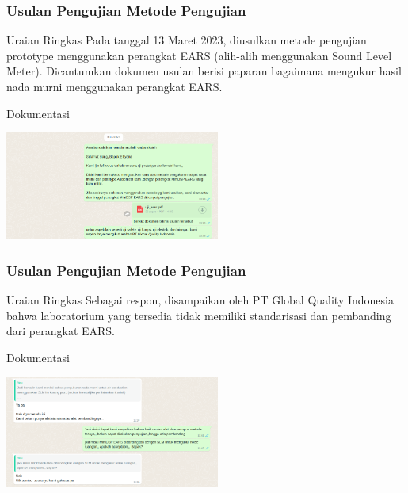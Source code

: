 \documentclass[table,dvipsnames]{beamer}
\begin{document}
	\begin{frame}
		\frametitle{Usulan Pengujian Metode Pengujian}

		\begin{exampleblock}{Uraian Ringkas}
			Pada tanggal 13 Maret 2023, diusulkan metode pengujian prototype menggunakan perangkat EARS (alih-alih menggunakan Sound Level Meter).
			Dicantumkan dokumen usulan berisi paparan bagaimana mengukur hasil nada murni menggunakan perangkat EARS.
		\end{exampleblock}

		\begin{exampleblock}{Dokumentasi}
			\begin{center}
				\includegraphics[width=200pt]{images/doc1}
			\end{center}
		\end{exampleblock}
	\end{frame}

	\begin{frame}
		\frametitle{Usulan Pengujian Metode Pengujian}

		\begin{exampleblock}{Uraian Ringkas}
			Sebagai respon, disampaikan oleh PT Global Quality Indonesia bahwa laboratorium yang tersedia tidak memiliki standarisasi dan pembanding dari perangkat EARS.
		\end{exampleblock}

		\begin{exampleblock}{Dokumentasi}
			\begin{center}
				\includegraphics[width=200pt]{images/doc2}
			\end{center}
		\end{exampleblock}
	\end{frame}
\end{document}
